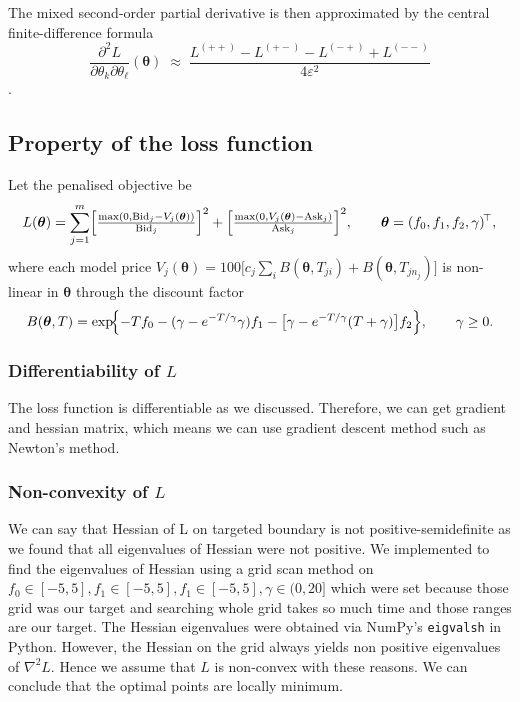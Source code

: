 \documentclass[12pt]{article}
\begin{document}
The mixed second-order partial derivative is then approximated by the central finite-difference formula
\[
\frac{\partial^{2}L}{\partial\theta_k\partial\theta_\ell}(\boldsymbol{\theta})
\;\approx\;
\frac{L^{(++)}-L^{(+-)}-L^{(-+)}+L^{(--)}}{4\varepsilon^{2}}
\].

\subsection{Property of the loss function}
\label{sec:property}
Let the penalised objective be
\[
L(\boldsymbol{\theta})
=\sum_{j=1}^{m}
  \Bigl[\tfrac{\max(0,\text{Bid}_{j}-V_{j}(\boldsymbol{\theta}))}
              {\text{Bid}_{j}}\Bigr]^{2}
 +\Bigl[\tfrac{\max(0,V_{j}(\boldsymbol{\theta})-\text{Ask}_{j})}
              {\text{Ask}_{j}}\Bigr]^{2},
\qquad 
\boldsymbol{\theta}=(f_0,f_1,f_2,\gamma)^{\!\top},
\]
where each model price  \(V_{j}(\boldsymbol{\theta})=100\bigl[c_j\sum_{i}B(\boldsymbol{\theta},T_{ji})
                               +B(\boldsymbol{\theta},T_{jn_j})\bigr]\) is non-linear in \(\boldsymbol{\theta}\) through the discount factor
\[
B(\boldsymbol{\theta},T)=
\exp\!\Bigl\{-Tf_0-(\gamma-e^{-T/\gamma}\gamma)f_1 -
          \bigl[\gamma-e^{-T/\gamma}(T+\gamma)\bigr]f_2\Bigr\},
\qquad \gamma\geq0.
\]
\subsubsection{Differentiability of \(L\)}
The loss function is differentiable as we discussed. Therefore, we can get gradient and hessian matrix, which means we can use gradient descent method such as Newton's method.

\subsubsection{Non-convexity of \(L\)}
We can say that Hessian of L on targeted boundary is not positive-semidefinite as we found that all eigenvalues of Hessian were not positive. We implemented to find the eigenvalues of Hessian using a grid scan method on $f_0\in[-5,5], f_1\in[-5,5],f_1\in[-5,5],\gamma\in(0,20]$ which were set because those grid was our target and searching whole grid takes so much time and those ranges are our target. The Hessian eigenvalues were obtained via NumPy's \texttt{eigvalsh} in Python. However, the Hessian on the grid always yields non positive eigenvalues of $\nabla^{2}L$. Hence we assume that \(L\) is non-convex with these reasons.
We can conclude that the optimal points are locally minimum. 
\end{document}
